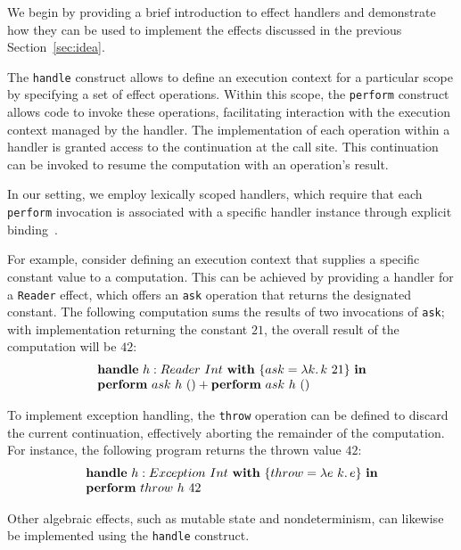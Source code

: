 \documentclass[acmsmall]{acmart}
\newcommand{\ap}{~}
\newcommand{\keyword}[1]{\mathbf{#1}}
\begin{document}
We begin by providing a brief introduction to effect handlers and demonstrate how they can be used to implement the effects discussed in the previous Section~\ref{sec:idea}.

The \texttt{handle} construct allows to define an execution context for a particular scope by specifying a set of effect operations.
Within this scope, the \texttt{perform} construct allows code to invoke these operations, facilitating interaction with the execution context managed by the handler.
The implementation of each operation within a handler is granted access to the continuation at the call site.
This continuation can be invoked to resume the computation with an operation's result.

In our setting, we employ lexically scoped handlers, which require that each \texttt{perform} invocation is associated with a specific handler instance through explicit binding~\cite{biernacki2019binders, brachthauser2020effects}.

For example, consider defining an execution context that supplies a specific constant value to a computation.
This can be achieved by providing a handler for a \texttt{Reader} effect, which offers an \texttt{ask} operation that returns the designated constant.
The following computation sums the results of two invocations of \texttt{ask}; with implementation returning the constant $21$, the overall result of the computation will be $42$:
\[
    \begin{array}{l}
        \keyword{handle} ~ h : Reader\ap Int ~\keyword{with}~ \{ ask = \lambda k\ldotp k\ap 21 \} ~\keyword{in} \\
        \keyword{perform}~ask~h~() + \keyword{perform}~ask~h~()
    \end{array}
\]

To implement exception handling, the \texttt{throw} operation can be defined to discard the current continuation, effectively aborting the remainder of the computation.
For instance, the following program returns the thrown value $42$:
\[
    \begin{array}{l}
        \keyword{handle}~ h : Exception\ap Int ~\keyword{with}~ \{throw = \lambda e~k\ldotp e \} ~\keyword{in} \\
        \keyword{perform}~throw~h~42
    \end{array}
\]

Other algebraic effects, such as mutable state and nondeterminism, can likewise be implemented using the \texttt{handle} construct. %
\end{document}
